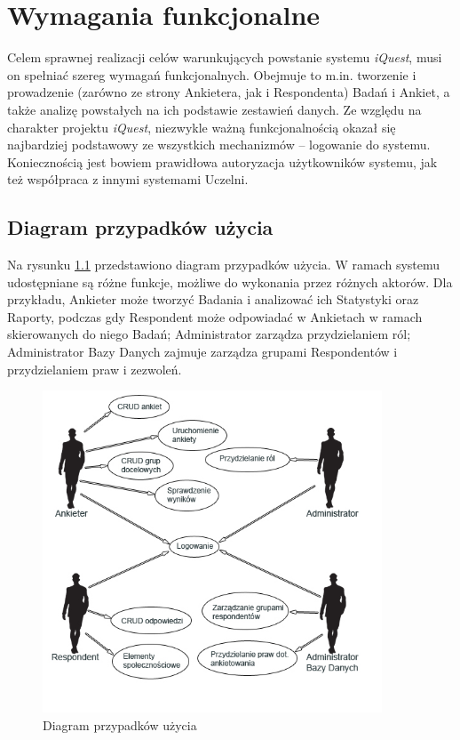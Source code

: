 \chapter{Wymagania funkcjonalne}
\label{Chapter3}

Celem sprawnej realizacji celów warunkujących powstanie systemu \textit{iQuest}, musi on spełniać szereg wymagań funkcjonalnych. Obejmuje to m.in. tworzenie i prowadzenie (zarówno ze strony Ankietera, jak i Respondenta) Badań i Ankiet, a także analizę powstałych na ich podstawie zestawień danych. Ze względu na charakter projektu \textit{iQuest}, niezwykle ważną funkcjonalnością okazał się najbardziej podstawowy ze wszystkich mechanizmów -- logowanie do systemu. Koniecznością jest bowiem prawidłowa autoryzacja użytkowników systemu, jak też współpraca z innymi systemami Uczelni.

\section{Diagram przypadków użycia}
\label{Chapter31}

Na rysunku \ref{rys:UseCaseView} przedstawiono diagram przypadków użycia. W ramach systemu udostępniane są różne funkcje, możliwe do wykonania przez różnych aktorów. Dla przykładu, Ankieter może tworzyć Badania i analizować ich Statystyki oraz Raporty, podczas gdy Respondent może odpowiadać w Ankietach w ramach skierowanych do niego Badań; Administrator zarządza przydzielaniem ról; Administrator Bazy Danych zajmuje zarządza grupami Respondentów i przydzielaniem praw i zezwoleń.

\begin{figure}[H]
\centering\includegraphics[width=0.9\textwidth]{figures/UseCaseView}
\caption{Diagram przypadków użycia}\label{rys:UseCaseView}
\end{figure}

